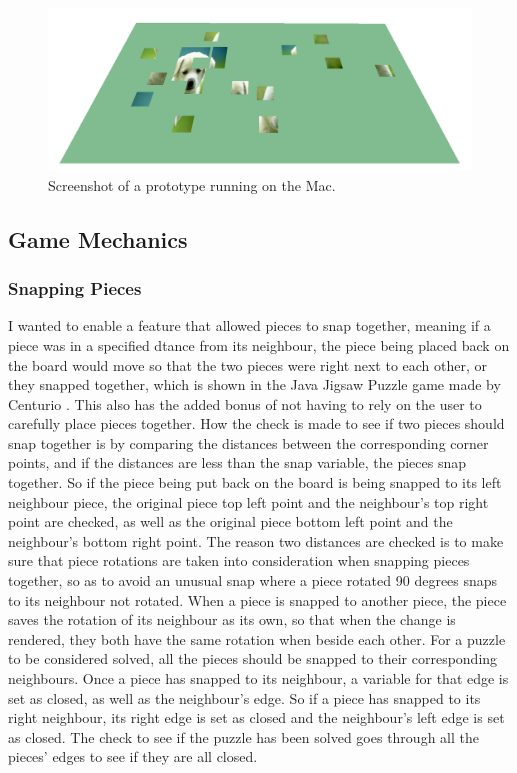 \documentclass{article}
\begin{document}
\begin{figure}[ht]
\begin{center}
\includegraphics[width=1.2\textwidth,center]{images/MacBuildImage}
\caption{Screenshot of a prototype running on the Mac.}
\label{fig:MacBuild}
\end{center}
\end{figure}

\subsection{Game Mechanics}

\subsubsection{Snapping Pieces} %
I wanted to enable a feature that allowed pieces to snap together, meaning if a
piece was in a specified dtance from its neighbour, the piece being placed back
on the board would move so that the two pieces were right next to each other, or
they snapped together, which is shown in the Java Jigsaw Puzzle game made by
Centurio \cite{ref:SourceJigsaw}. This also has the added bonus of not having to
rely on the user to carefully place pieces together. How the check is made to
see if two pieces should snap together is by comparing the distances between the
corresponding corner points, and if the distances are less than the snap
variable, the pieces snap together. So if the piece being put back on the board
is being snapped to its left neighbour piece, the original piece top left point
and the neighbour's top right point are checked, as well as the original piece
bottom left point and the neighbour's bottom right point. The reason two
distances are checked is to make sure that piece rotations are taken into
consideration when snapping pieces together, so as to avoid an unusual snap
where a piece rotated 90 degrees snaps to its neighbour not rotated. When a
piece is snapped to another piece, the piece saves the rotation of its neighbour
as its own, so that when the change is rendered, they both have the same
rotation when beside each other. For a puzzle to be considered solved, all the
pieces should be snapped to their corresponding neighbours. Once a piece has
snapped to its neighbour, a variable for that edge is set as closed, as well as
the neighbour's edge. So if a piece has snapped to its right neighbour, its
right edge is set as closed and the neighbour's left edge is set as closed. The
check to see if the puzzle has been solved goes through all the pieces' edges to
see if they are all closed.
\end{document}
